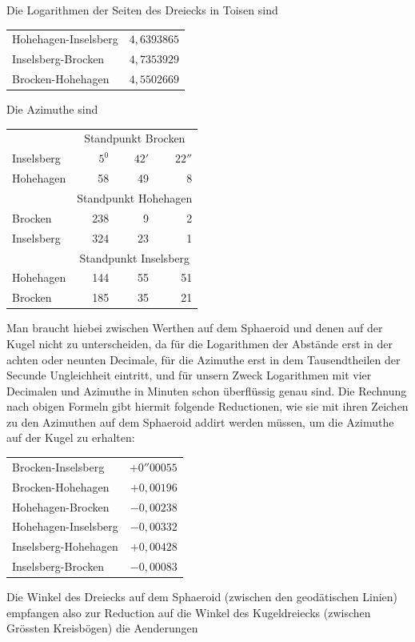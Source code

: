 \hspace*{\parindent}Die Logarithmen der Seiten des Dreiecks in Toisen sind
\begin{center}
\begin{tabular}{lr}
Hohehagen-Inselsberg&\(4{,}6393865\)\\
Inselsberg-Brocken&\(4{,}7353929\)\\
Brocken-Hohehagen&\(4{,}5502669\)
\end{tabular}
\end{center}
\hspace*{\parindent}Die Azimuthe sind
\begin{center}
\begin{tabular}{lrrr}
&\multicolumn{3}{c}{Standpunkt Brocken}\\
Inselsberg&\(5^0\)&\(42'\)&\(22''\)\\
Hohehagen&58&49&8\\
&\multicolumn{3}{c}{Standpunkt Hohehagen}\\
Brocken&238&9&2\\
Inselsberg&324&23&1\\
&\multicolumn{3}{c}{Standpunkt Inselsberg}\\
Hohehagen&144&55&51\\
Brocken&185&35&21
\end{tabular}
\end{center}
\hspace*{\parindent}Man braucht hiebei zwischen Werthen auf dem Sphaeroid und denen auf der Kugel nicht zu unterscheiden, da für die Logarithmen der Abstände erst in der achten oder neunten Decimale, für die Azimuthe erst in dem Tausendtheilen der Secunde Ungleichheit eintritt, und für unsern Zweck Logarithmen mit vier Decimalen und Azimuthe in Minuten schon überflüssig genau sind. Die Rechnung nach obigen Formeln gibt hiermit folgende Reductionen, wie sie mit ihren Zeichen zu den Azimuthen auf dem Sphaeroid addirt werden müssen, um die Azimuthe auf der Kugel zu erhalten:
\begin{center}
\begin{tabular}{lr}
Brocken-Inselsberg&\(+0''00055\)\\
Brocken-Hohehagen&\(+0{,}00196\)\\
Hohehagen-Brocken&\(-0{,}00238\)\\
Hohehagen-Inselsberg&\(-0{,}00332\)\\
Inselsberg-Hohehagen&\(+0{,}00428\)\\
Inselsberg-Brocken&\(-0{,}00083\)
\end{tabular}
\end{center}
\hspace*{\parindent}Die Winkel des Dreiecks auf dem Sphaeroid (zwischen den geodätischen Linien) empfangen also zur Reduction auf die Winkel des Kugeldreiecks (zwischen Grössten Kreisbögen) die Aenderungen
